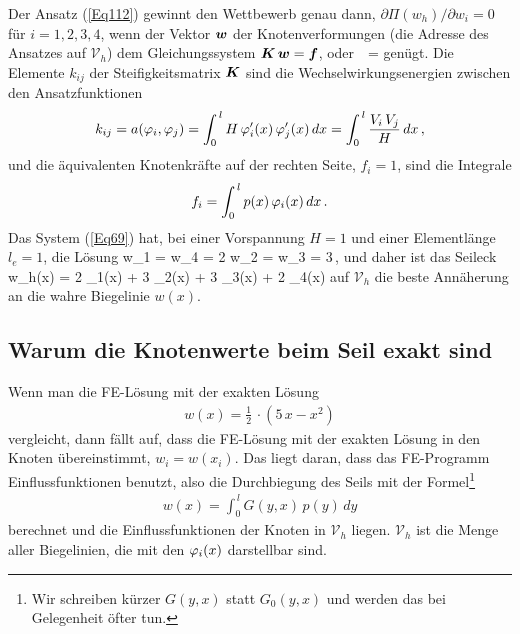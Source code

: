 Der Ansatz (\ref{Eq112}) gewinnt den Wettbewerb genau dann, $\partial \Pi(w_h)/ \partial w_i = 0$ f\"{u}r $i = 1,2,3,4$, wenn der Vektor $\mbox{\boldmath $w$}$ der Knotenverformungen (die \glq Adresse\grq{} des Ansatzes auf $\mathcal{V}_h$) dem Gleichungssystem $\mbox{\boldmath $K$}\,\mbox{\boldmath $w$} = \mbox{\boldmath $f$}$, oder
\beq\label{Eq69}
 \,  
\, = 
\eeq
gen\"{u}gt. Die Elemente $k_{ij}$ der Steifigkeitsmatrix $\mbox{\boldmath $K$}$ sind die Wechselwirkungsenergien zwischen den Ansatzfunktionen
\begin{align}
k_{ij} = a(\varphi_i,\varphi_j) = \int_0^{\,l} H\,\varphi_i'(x)\,\varphi_j'(x)\,dx = \int_0^{\,l} \frac{V_i\,V_j}{H}\,dx\,,
\end{align}
und die \"{a}quivalenten Knotenkr\"{a}fte auf der rechten Seite, $f_i = 1$, sind die Integrale
\begin{align}
f_i = \int_0^{\,l} p(x)\,\varphi_i(x)\,dx\, .
\end{align}
Das System (\ref{Eq69}) hat, bei einer Vorspannung $H = 1$ und einer Elementl\"{a}nge $l_e = 1$, die L\"{o}sung
\beq
w_1 = w_4 = 2 \qquad w_2 = w_3 =  3\,,
\eeq
und daher ist das Seileck
\beq\label{A11Resultat}
w_h(x) = 2 \cdot  \Np_1(x) + 3 \cdot \Np_2(x) + 3 \cdot \Np_3(x) + 2 \cdot \Np_4(x)
\eeq
auf $\mathcal{V}_h$ die beste Ann\"{a}herung  an die wahre Biegelinie $w(x)$.


{\textcolor{sectionTitleBlue}{\section{Warum die Knotenwerte beim Seil exakt sind}}}
Wenn man die FE-L\"{o}sung mit der exakten L\"{o}sung
\begin{align}
w(x) = \frac{1}{2}\,\cdot (5\,x - x^2)
\end{align}
vergleicht, dann f\"{a}llt auf, dass die FE-L\"{o}sung mit der exakten L\"{o}sung in den Knoten \"{u}bereinstimmt, $w_i = w(x_i)$. Das  liegt daran, dass das FE-Programm Einflussfunktionen benutzt, also die Durchbiegung des Seils mit der Formel\footnote{Wir schreiben k\"{u}rzer $G(y,x)$ statt $G_0(y,x)$ und werden das bei Gelegenheit \"{o}fter tun.}
\begin{align}
w(x) = \int_0^{\,l} G(y,x)\,p(y)\,dy
\end{align}
berechnet und die Einflussfunktionen der Knoten in $\mathcal{V}_h$ liegen. $\mathcal{V}_h$ ist die Menge aller Biegelinien, die mit den $\varphi_i(x)$ darstellbar sind.

